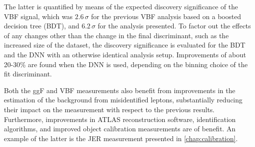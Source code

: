 The latter is quantified by means of the expected discovery significance of the VBF signal, which was $2.6\,\sigma$ for the previous VBF analysis based on a boosted decision tree (BDT), and $6.2\,\sigma$ for the analysis presented. 
To factor out the effects of any changes other than the change in the final discriminant, such as the increased size of the dataset, the discovery significance is evaluated for the BDT and the DNN with an otherwise identical analysis setup. Improvements of about 20-30\% are found when the DNN is used, depending on the binning choice of the fit discriminant. 

Both the ggF and VBF measurements also benefit from improvements in the estimation of the background from misidentified leptons, substantially reducing their impact on the measurement with respect to the previous results. 
Furthermore, improvements in ATLAS reconstruction software, identification algorithms, and improved object calibration measurements are of benefit. 
An example of the latter is the JER measurement presented in \cref{chap:calibration}. 

